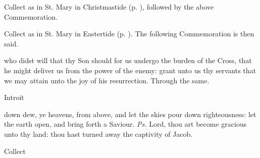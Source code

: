 
\begin{rubric}
	Collect as in St. Mary in Christmastide (p. \pageref{SPMaryPostChristmas}), followed by the above Commemoration.
\end{rubric}
\begin{rubric}
	Collect as in St. Mary in Eastertide (p. \pageref{SPMaryInEaster}). The following Commemoration is then said.
\end{rubric}
 who didst will that thy Son should for us undergo the burden of the Cross, that he might deliver us from the power of the enemy: grant unto us thy servants that we may attain unto the joy of his resurrection. Through the same.
\begin{inhead}
    Introit
\end{inhead}
 down dew, ye heavens, from above, and let the skies pour down righteousness: let the earth open, and bring forth a Saviour. \textit{Ps.} Lord, thou art become gracious unto thy land: thou hast turned away the captivity of Jacob.
\begin{inhead}
    Collect
\end{inhead}
